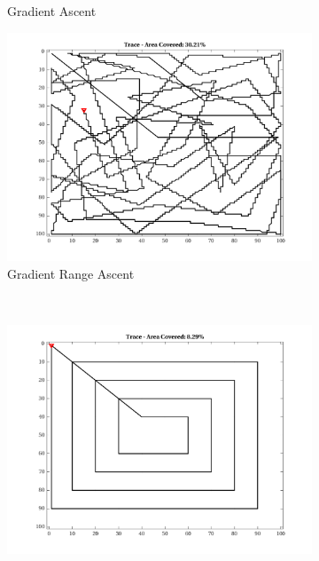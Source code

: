 \begin{figure}[htb!]
\begin{subfigure}[t]{0.3333\textwidth}
        \captionsetup{skip=0.20\baselineskip,size=footnotesize}
        \caption{Gradient Ascent}
    \end{subfigure}%
    \begin{subfigure}[t]{0.3333\textwidth}
        \centering
        \includegraphics[width=\linewidth]{figures/hbresults/path_gr_30p_100x100_sf_100_seed_2.png}
        \captionsetup{skip=0.20\baselineskip,size=footnotesize}
        \caption{Gradient Range Ascent}
    \end{subfigure}%
    \\
    \begin{subfigure}[t]{0.3333\textwidth}
        \centering
        \includegraphics[width=\linewidth]{figures/hbresults/path_zz_10p_100x100_sf_100_seed_2.png}

\end{subfigure}
\end{figure}
